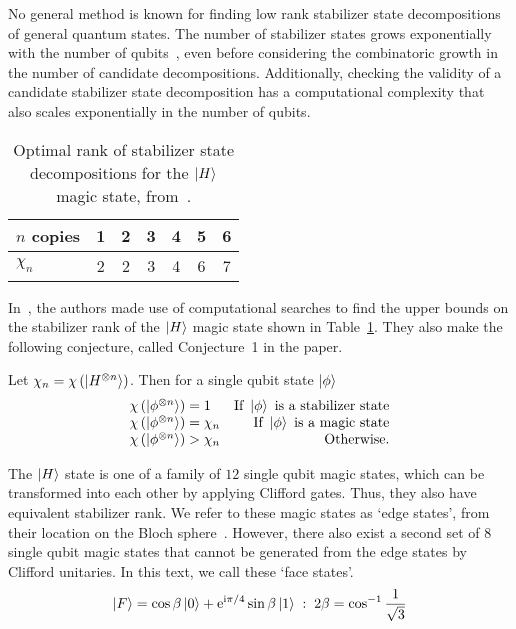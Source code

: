 No general method is known for finding low rank stabilizer state decompositions of general quantum states. The number of stabilizer states grows exponentially with the number of qubits~\cite{Aaronson2004}, even before considering the combinatoric growth in the number of candidate decompositions. Additionally, checking the validity of a candidate stabilizer state decomposition has a computational complexity that also scales exponentially in the number of qubits.\par
\begin{table}[H]
\centering
\begin{tabular}{|l|c|c|c|c|c|c|}
\hline
$n$ copies & 1 & 2 & 3 & 4 & 5 & 6 \\
\hline
$\chi_{n}$ & 2 & 2 & 3 & 4 & 6 & 7\\
\hline
\end{tabular}
\caption{Optimal rank of stabilizer state decompositions for the $\ket{H}$ magic state, from~\cite{Bravyi2015}.}
\label{tab:bss_h_rank}
\end{table}
In~\cite{Bravyi2015}, the authors made use of computational searches to find the upper bounds on the stabilizer rank of the $\ket{H}$ magic state shown in Table~\ref{tab:bss_h_rank}. They also make the following conjecture, called Conjecture~1 in the paper.
\begin{conj}
Let $\chi_{n}=\chi\left(\ket{H^{\otimes n}}\right)$. Then for a single qubit state $\ket{\phi}$
\[
\begin{array}{lr}
\chi\left(\ket{\phi^{\otimes n}}\right) = 1 & \text{If }\ket{\phi}\text{ is a stabilizer state}\\
\chi\left(\ket{\phi^{\otimes n}}\right) = \chi_{n} & \text{If }\ket{\phi}\text{ is a magic state}\\
\chi\left(\ket{\phi^{\otimes n}}\right) > \chi_{n} & \text{Otherwise.}
\end{array}
\]
\label{conj:magic_srank}
\end{conj}
The $\ket{H}$ state is one of a family of $12$ single qubit magic states, which can be transformed into each other by applying Clifford gates. Thus, they also have equivalent stabilizer rank. We refer to these magic states as `edge states', from their location on the Bloch sphere~\cite{Bravyi2005}. However, there also exist a second set of $8$ single qubit magic states that cannot be generated from the edge states by Clifford unitaries. In this text, we call these `face states'.
\begin{equation}
\ket{F} = \cos{\beta}\ket{0}+\mathrm{e}^{\mathrm{i} \pi/4}\sin{\beta}\ket{1} \;:\;2\beta=\cos^{-1}{\frac{1}{\sqrt{3}}}
\label{eq:face_state}
\end{equation}
